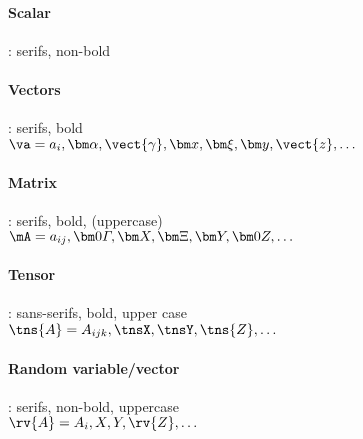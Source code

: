 \documentclass{article}
\begin{document}
	\paragraph{Scalar}: serifs, non-bold \\
	\paragraph{Vectors}: serifs, bold \\
	$\va = a_i, \valpha, \vect{\gamma},  \vx, \vxi, \vy, \vect{z}, \dots$
	
	\paragraph{Matrix}: serifs, bold, (uppercase) \\
	$\mA = a_{ij} , \mat{\varGamma},  \mX, \mXi, \mY, \mat{Z}, \dots$
		
	\paragraph{Tensor}: sans-serifs, bold, upper case \\
	$\tns{A} = A_{ijk}, \tnsX, \tnsY, \tns{Z}, \dots $	
	
	\paragraph{Random variable/vector}: serifs, non-bold, uppercase \\
	$\rv{A} = A_{i}, \rvX, \rvY, \rv{Z}, \dots $			
\end{document}
